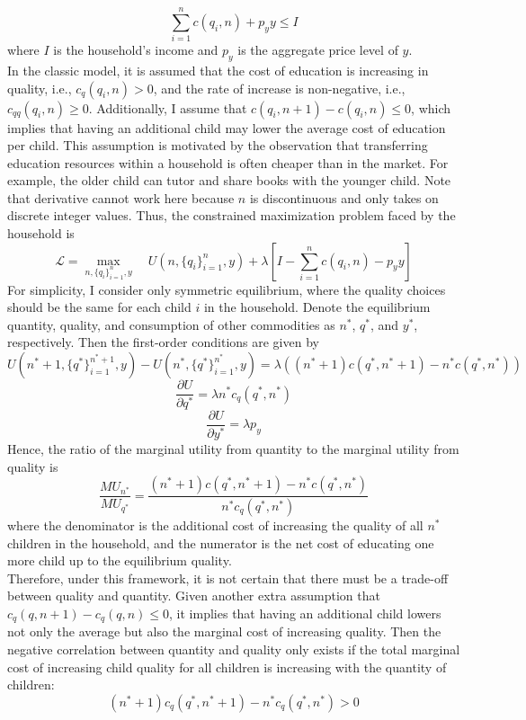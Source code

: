 \documentclass[12pt]{extarticle}
\begin{document}
$$\sum_{i=1}^{n}c(q_i,n)+p_{y}y \leq I$$ 
where $I$ is the household's income and $p_y$ is the aggregate price level of $y$. \\
\indent In the classic model, it is assumed that the cost of education is increasing in quality, i.e., $c_{q}(q_i,n) > 0$, and the rate of increase is non-negative, i.e., $c_{qq}(q_i,n) \geq 0$. Additionally, I assume that $c(q_i,n+1)-c(q_i,n) \leq 0$, which implies that having an additional child may lower the average cost of education per child. This assumption is motivated by the observation that transferring education resources within a household is often cheaper than in the market. For example, the older child can tutor and share books with the younger child. Note that derivative cannot work here because $n$ is discontinuous and only takes on discrete integer values. Thus, the constrained maximization problem faced by the household is 
$$\mathcal{L}=\max_{n,\{q_i\}_{i=1}^{n},y}\quad {U(n,\{q_i\}_{i=1}^{n},y)+\lambda[I-\sum_{i=1}^{n}c(q_i,n)-p_{y}y]}$$ 
\indent For simplicity, I consider only symmetric equilibrium, where the quality choices should be the same for each child $i$ in the household. Denote the equilibrium quantity, quality, and consumption of other commodities as $n^{*}$, $q^{*}$, and $y^{*}$, respectively. Then the first-order conditions are given by
$$U(n^{*}+1,\{q^{*}\}_{i=1}^{n^{*}+1},y)-U(n^{*},\{q^{*}\}_{i=1}^{n^{*}},y) = \lambda((n^{*}+1)c(q^{*},n^{*}+1)-n^{*}c(q^{*},n^{*}))$$
$$\frac{\partial U}{\partial q^{*}} = \lambda n^{*}c_{q}(q^{*},n^{*})$$
$$\frac{\partial U}{\partial y^{*}} = \lambda p_{y}$$ 
Hence, the ratio of the marginal utility from quantity to the marginal utility from quality is
$$\frac{{MU}_{n^{*}}}{{MU}_{q^{*}}}=\frac{(n^{*}+1)c(q^{*},n^{*}+1)-n^{*}c(q^{*},n^{*})}{n^{*}c_{q}(q^{*},n^{*})}$$ 
where the denominator is the additional cost of increasing the quality of all $n^{*}$ children in the household, and the numerator is the net cost of educating one more child up to the equilibrium quality. \\
\indent Therefore, under this framework, it is not certain that there must be a trade-off between quality and quantity. Given another extra assumption that $c_{q}(q,n+1)-c_{q}(q,n) \leq 0$, it implies that having an additional child lowers not only the average but also the marginal cost of increasing quality. Then the negative correlation between quantity and quality only exists if the total marginal cost of increasing child quality for all children is increasing with the quantity of children:
$$(n^{*}+1)c_{q}(q^{*},n^{*}+1)-n^{*}c_{q}(q^{*},n^{*}) > 0$$
\end{document}
